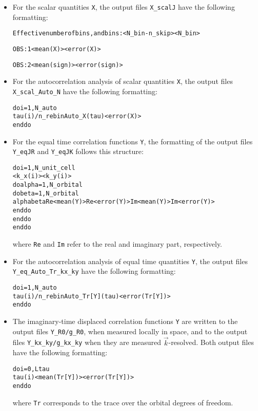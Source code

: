 \documentclass{SciPost}
\begin{document}
\begin{itemize}
\item For the scalar quantities \texttt{X}, the output files  \texttt{X\_scalJ} have the following formatting:
\begin{alltt}
Effective number of bins, and bins:      <N_bin - n_skip>      <N_bin>

OBS :    1      <mean(X)>      <error(X)>

OBS :    2      <mean(sign)>   <error(sign)>
\end{alltt}

\item For the autocorrelation analysis of scalar quantities \texttt{X}, the output files  \texttt{X\_scal\_Auto\_N} have the following formatting:
\begin{alltt}
	do i = 1, N_auto
	   tau(i)/n_rebin   Auto_X(tau)   <error( X )>
	enddo
\end{alltt}

\item For the equal time correlation functions \texttt{Y}, the formatting of the output files \texttt{Y\_eqJR} and \texttt{Y\_eqJK} follows this structure:
\begin{alltt}
do i = 1, N_unit_cell
   <k_x(i)>   <k_y(i)>
   do alpha = 1, N_orbital
   do beta  = 1, N_orbital
      alpha  beta  Re<mean(Y)>  Re<error(Y)>  Im<mean(Y)>  Im<error(Y)>
   enddo
   enddo
enddo
\end{alltt}
where \texttt{Re} and \texttt{Im} refer to the real and imaginary part, respectively.

\item For the autocorrelation analysis of equal time quantities \texttt{Y}, the output files  \texttt{Y\_eq\_Auto\_Tr\_kx\_ky} have the following formatting:
\begin{alltt}
	do i = 1, N_auto
	   tau(i)/n_rebin   Auto_Tr[Y](tau)   <error( Tr[Y] )>
	enddo
\end{alltt}

\item The imaginary-time displaced correlation functions \texttt{Y} are written to the output files \texttt{Y\_R0/g\_R0}, when measured locally in space, 
and to the output files \texttt{Y\_kx\_ky/g\_kx\_ky} when they are measured $\vec{k}$-resolved. 
Both output files have the following formatting:
\begin{alltt}
do i = 0, Ltau
   tau(i)   <mean( Tr[Y] )>   <error( Tr[Y])>
enddo
\end{alltt}
where \texttt{Tr} corresponds to the trace over the orbital degrees of freedom.

\end{itemize}
\end{document}
